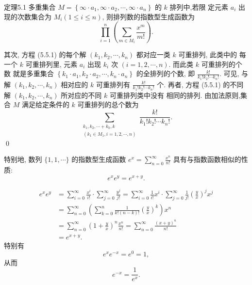 \documentclass[punct]{ctexbeamer}
\begin{document}
\begin{frame}
 	\begin{block}{定理5.1}
     多重集合 $M=\left\{\infty \cdot a_{1}, \infty \cdot a_{2}, \cdots, \infty \cdot a_{n}\right\}$ 的 $k$ 排列中,若限 定元素 $a_{i}$ 出现的次数集合为 $M_{i}(1 \leqslant i \leqslant n)$, 则排列数的指数型生成函数为
     $$
     \prod_{i=1}^{n}\left(\sum_{m \in M_{i}} \frac{x^{m}}{m !}\right).
     $$
 \end{block}
其次, 方程 (5.5.1) 的每个解 $\left(k_1, k_2, \cdots, k_n\right)$ 都对应一类 $k$ 可重排列, 此类中的 每一个 $k$ 可重排列里, 元素 $a_i$ 出现 $k_i$ 次 $(i=1,2, \cdots, n)$. 而此类 $k$ 可重排列的个数 就是多重集合 $\left\{k_1 \cdot a_1, k_2 \cdot a_2, \cdots, k_n \cdot a_n\right\}$ 的全排列的个数, 即 $\frac{k !}{k_{1} ! k_{2} ! \cdots k_{n} !}$. 可见, 与解 $\left(k_1, k_2, \cdots, k_n\right)$ 相对应的 $k$ 可重排列有 $\frac{k !}{k_{1} ! k_{2} ! \cdots k_{n} !}$ 个.
再者, 方程 (5.5.1) 的不同解 $\left(k_1, k_2, \cdots, k_n\right)$ 所对应的不同 $k$ 可重排列类中没有 相同的排列.
由加法原则,集合 $M$ 满足给定条件的 $k$ 可重排列的总个数为
$$
\sum_{\substack{k_1, k_2, \cdots+k_k, k \\\left(k_1 \in M_1, i=1,2, \cdots, n\right)}} \frac{k !}{k_{1} ! k_{2} ! \cdots k_{n} !} .
$$
\qed


\end{frame}
\begin{frame}
    特别地, 数列 $\{1,1, \cdots\}$ 的指数型生成函数 $e^x=\sum_{n=0}^{\infty} \frac{x^{n}}{n !}$ 具有与指数函数相似的性质:
    $$
    e^x e^y=e^{x+y}.
    $$

	$$
	\begin{aligned}
	e^x e^y &=\sum_{i=0}^{\infty} \frac{x^{i}}{i !} \cdot \sum_{j=0}^{\infty} \frac{y^{j}}{j !} =\sum_{i=0}^{\infty} \frac{1}{i !} x^{i} \cdot \sum_{j=0}^{\infty} \frac{1}{j !}\left(\frac{y}{x}\right)^{j} x^{j} \\
	&=\sum_{n=0}^{\infty}\left(\sum_{k=0}^{n} \frac{1}{k !(n-k) !}\left(\frac{y}{x}\right)^{k}\right) x^{n} \\
	&=\sum_{n=0}^{\infty}\left(1+\frac{y}{x}\right)^{n} \frac{x^{n}}{n !} =\sum_{n=0}^{\infty} \frac{(x+y)^{n}}{n !} \\
	&=e^{x+y}.
	\end{aligned}
	$$
	特别有
	$$
	e^x e^{-x}=e^0=1,
	$$
	从而
	$$
	e^{-x}=\frac{1}{e^x}.
	$$
\end{frame}
\end{document}
